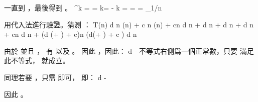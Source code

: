 一直到 ，最後得到 。
\startsplitformula\startmathalignment
\NC \NC \alpha^k =  \NR
\NC \Rightarrow \NC {} = \log{} \NR
\NC \Rightarrow \NC k\log\alpha = -  \NR
\NC \Rightarrow \NC k =  =  = \log_{1/\alpha}n \NR
\stopmathalignment\stopsplitformula

用代入法進行驗證。猜測 ：
\startsplitformula\startmathalignment
\NC T(n) \NC \le d \alpha n \lg(\alpha n) + c \beta n \lg(\beta n) + cn \NR
\NC      \NC \le d \alpha n  + d \beta n  + d \alpha n \lg\alpha + d \beta n \lg\beta + cn \NR
\NC      \NC \le d n  + \big(d (\alpha \lg\alpha + \beta \lg\beta) + c\big)n
                \qquad (d(\alpha\lg\alpha + \beta\lg\beta) + c )\NR
\NC      \NC \le d n  \NR
\stopmathalignment\stopsplitformula

由於  並且 ，
有  以及 。
因此 ，因此：
\startformula
d \ge -
\stopformula
不等式右側爲一個正常數，只要  滿足此不等式，  就成立。

同理若要 ，只需  即可，
即：
 \le d \le -
\stopformula

因此 。
\stopANSWER

\stopsection
